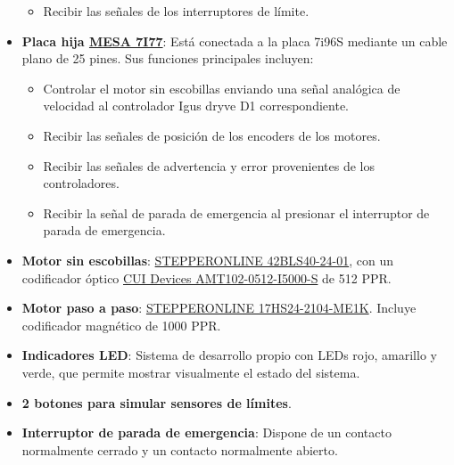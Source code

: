 \documentclass[english,spanish,a4paper,11pt]{article}
\begin{document}
\begin{itemize}
\begin{itemize}
        \item Recibir las señales de los interruptores de límite.
    \end{itemize}
    
    \item \textbf{Placa hija \href{http://store.mesanet.com/index.php?route=product/product&product_id=120}{MESA 7I77}}: Está conectada a la placa 7i96S mediante un cable plano de 25 pines. Sus funciones principales incluyen:
    \begin{itemize}
        \item Controlar el motor sin escobillas enviando una señal analógica de velocidad al controlador Igus dryve D1 correspondiente.
        
        \item Recibir las señales de posición de los encoders de los motores.
        
        \item Recibir las señales de advertencia y error provenientes de los controladores.

        \item Recibir la señal de parada de emergencia al presionar el interruptor de parada de emergencia.
    \end{itemize}

    \item \textbf{Motor sin escobillas}: \href{https://www.omc-stepperonline.com/24v-4000rpm-0-0625nm-26w-1-8a-42x42x40mm-brushless-dc-motor-42bls40-24-01}{STEPPERONLINE 42BLS40-24-01}, con un codificador óptico \href{https://www.cuidevices.com/product/motion-and-control/rotary-encoders/incremental/modular/amt10-series}{CUI Devices AMT102-0512-I5000-S} de 512 \ac{PPR}.
    
    \item \textbf{Motor paso a paso}: \href{https://www.omc-stepperonline.com/nema-17-closed-loop-stepper-motor-65ncm-92oz-in-with-magnetic-encoder-1000ppr-4000cpr-17hs24-2104-me1k}{STEPPERONLINE 17HS24-2104-ME1K}. Incluye codificador magnético de 1000 \ac{PPR}.
    
    \item \textbf{Indicadores LED}: Sistema de desarrollo propio con LEDs rojo, amarillo y verde, que permite mostrar visualmente el estado del sistema.
    
    \item \textbf{2 botones para simular sensores de límites}.
        
    \item \textbf{Interruptor de parada de emergencia}: Dispone de un contacto normalmente cerrado y un contacto normalmente abierto.
\end{itemize}
\end{document}
